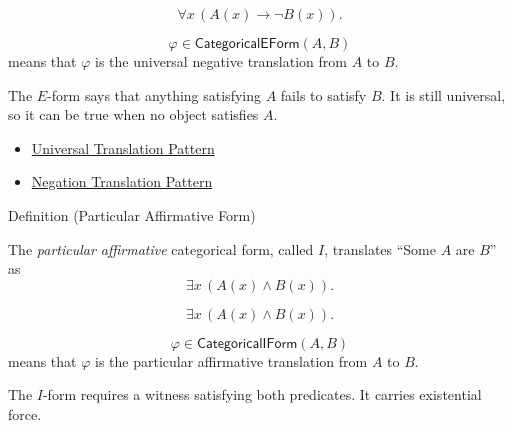 \begin{remark*}
\[
\forall x\,(A(x)\to \neg B(x)).
\]
\end{remark*}

\begin{remark*}
\[
  \varphi\in\mathsf{CategoricalEForm}(A,B)
\] means that \(\varphi\) is the
universal negative translation from \(A\) to \(B\).
\end{remark*}

\begin{remark*}[Interpretation]
The \(E\)-form says that anything satisfying \(A\) fails to satisfy \(B\). It
is still universal, so it can be true when no object satisfies \(A\).
\end{remark*}

\begin{dependencies}
\begin{itemize}
  \item \hyperref[prop:universal-translation-pattern]{Universal Translation Pattern}
  \item \hyperref[prop:negation-translation-pattern]{Negation Translation Pattern}
\end{itemize}
\end{dependencies}

\begin{definitionbox}{Definition (Particular Affirmative Form)}
\begin{definition}
\label{def:categorical-i-form-predicate-logic}
The \emph{particular affirmative} categorical form, called \(I\), translates
``Some \(A\) are \(B\)'' as
\[
\exists x\,(A(x)\land B(x)).
\]
\end{definition}
\end{definitionbox}

\begin{remark*}
\[
\exists x\,(A(x)\land B(x)).
\]
\end{remark*}

\begin{remark*}
\[
  \varphi\in\mathsf{CategoricalIForm}(A,B)
\] means that \(\varphi\) is the
particular affirmative translation from \(A\) to \(B\).
\end{remark*}

\begin{remark*}[Interpretation]
The \(I\)-form requires a witness satisfying both predicates. It carries
existential force.
\end{remark*}

